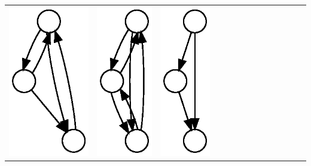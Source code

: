 \begin{table}[t!]
\begin{tabular}{l|lllllllllllll}
    \includegraphics[height=0.03\textheight]{M3-plain} &
    \includegraphics[height=0.03\textheight]{M4-plain} &
    \includegraphics[height=0.03\textheight]{M5-plain} &

\end{tabular}
\end{table}

